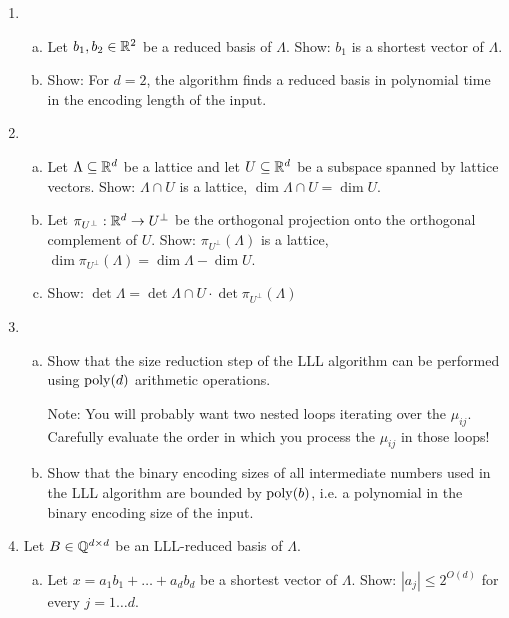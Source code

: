 \begin{enumerate}
  \item
  \begin{enumerate}[(a)]
    \item Let $b_1,b_2 \in \mathbb{R}^2$ be a reduced basis of $\Lambda$.
      Show: $b_1$ is a shortest vector of $\Lambda$.

    \item Show: For $d=2$,
      the algorithm  finds a reduced basis in polynomial time
      in the encoding length of the input.
  \end{enumerate}

  \item
  \begin{enumerate}[(a)]
    \item Let $\Lambda \subseteq \mathbb{R}^d$ be a lattice and
    let $U \subseteq \mathbb{R}^d$ be a subspace spanned by lattice vectors.
    Show: $\Lambda \cap U$ is a lattice, $\dim \Lambda \cap U = \dim U$.

    \item Let $\pi_{U^\bot} : \mathbb{R}^d \to U^\bot$ be the orthogonal projection onto the orthogonal
    complement of $U$.
    Show: $\pi_{U^\bot} (\Lambda)$ is a lattice, $\dim \pi_{U^\bot} (\Lambda) = \dim \Lambda - \dim U$.

    \item Show: $\det \Lambda = \det \Lambda \cap U \cdot \det \pi_{U^\bot} (\Lambda)$
  \end{enumerate}

  \item
    \begin{enumerate}[(a)]
      \item Show that the size reduction step of the LLL algorithm can be performed using $\operatorname{poly}(d)$ arithmetic operations.

        Note: You will probably want two nested loops iterating over the $\mu_{ij}$.
        Carefully evaluate the order in which you process the $\mu_{ij}$ in those loops!

      \item Show that the binary encoding sizes of all intermediate numbers used in the LLL algorithm
        are bounded by $\operatorname{poly}(b)$, i.e. a polynomial in the binary encoding size of the input.
    \end{enumerate}

  \item
    Let $B \in \mathbb{Q}^{d \times d}$ be an LLL-reduced basis of $\Lambda$.
    \begin{enumerate}[(a)]
      \item Let $x = a_1 b_1 + \dots + a_d b_d$ be a shortest vector of $\Lambda$.
        Show: $|a_j| \leq 2^{O(d)}$ for every $j = 1 \dots d$.


\end{enumerate}
\end{enumerate}
